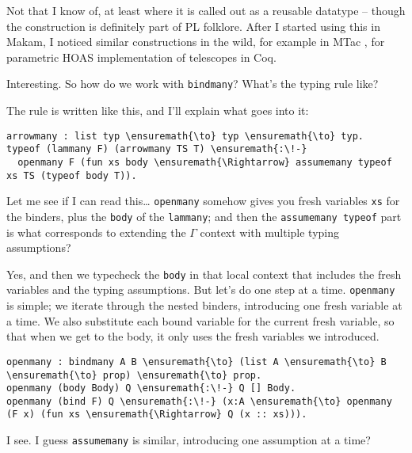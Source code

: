 \heroADVISOR{} Not that I know of, at least where it is called out as a
reusable datatype -- though the construction is definitely part of PL
folklore. After I started using this in Makam, I noticed similar
constructions in the wild, for example in MTac \citep{ziliani2013mtac},
for parametric HOAS implementation of telescopes in Coq.

\heroSTUDENT{} Interesting. So how do we work with \texttt{bindmany}? What's
the typing rule like?

\heroADVISOR{} The rule is written like this, and I'll explain what goes into
it:

\importantCodeblock{}

\begin{verbatim}
arrowmany : list typ \ensuremath{\to} typ \ensuremath{\to} typ.
typeof (lammany F) (arrowmany TS T) \ensuremath{:\!-}
  openmany F (fun xs body \ensuremath{\Rightarrow} assumemany typeof xs TS (typeof body T)).
\end{verbatim}

\importantCodeblockEnd{}

\heroSTUDENT{} Let me see if I can read this\ldots{} \texttt{openmany} somehow
gives you fresh variables \texttt{xs} for the binders, plus the
\texttt{body} of the \texttt{lammany}; and then the
\texttt{assumemany\ typeof} part is what corresponds to extending the
\(\Gamma\) context with multiple typing assumptions?

\heroADVISOR{} Yes, and then we typecheck the \texttt{body} in that local
context that includes the fresh variables and the typing assumptions.
But let's do one step at a time. \texttt{openmany} is simple; we iterate
through the nested binders, introducing one fresh variable at a time. We
also substitute each bound variable for the current fresh variable, so
that when we get to the body, it only uses the fresh variables we
introduced.

\importantCodeblock{}

\begin{verbatim}
openmany : bindmany A B \ensuremath{\to} (list A \ensuremath{\to} B \ensuremath{\to} prop) \ensuremath{\to} prop.
openmany (body Body) Q \ensuremath{:\!-} Q [] Body.
openmany (bind F) Q \ensuremath{:\!-} (x:A \ensuremath{\to} openmany (F x) (fun xs \ensuremath{\Rightarrow} Q (x :: xs))).
\end{verbatim}

\importantCodeblockEnd{}

\heroSTUDENT{} I see. I guess \texttt{assumemany} is similar, introducing one
assumption at a time?

